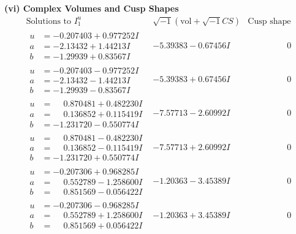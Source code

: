 \documentclass[1p]{elsarticle_modified}
\theoremstyle{definition}
\newcommand{\I}{\sqrt{-1}}
\begin{document}
\newpage\flushleft \textbf{(vi) Complex Volumes and Cusp Shapes}
$$\begin{array}{c|c|c}  
\text{Solutions to }I^u_{1}& \I (\text{vol} + \sqrt{-1}CS) & \text{Cusp shape}\\
 \hline 
\begin{aligned}
u &= -0.207403 + 0.977252 I \\
a &= -2.13432 + 1.44213 I \\
b &= -1.29939 + 0.83567 I\end{aligned}
 & -5.39383 - 0.67456 I & \phantom{-0.000000 } 0 \\ \hline\begin{aligned}
u &= -0.207403 - 0.977252 I \\
a &= -2.13432 - 1.44213 I \\
b &= -1.29939 - 0.83567 I\end{aligned}
 & -5.39383 + 0.67456 I & \phantom{-0.000000 } 0 \\ \hline\begin{aligned}
u &= \phantom{-}0.870481 + 0.482230 I \\
a &= \phantom{-}0.136852 + 0.115419 I \\
b &= -1.231720 - 0.550774 I\end{aligned}
 & -7.57713 - 2.60992 I & \phantom{-0.000000 } 0 \\ \hline\begin{aligned}
u &= \phantom{-}0.870481 - 0.482230 I \\
a &= \phantom{-}0.136852 - 0.115419 I \\
b &= -1.231720 + 0.550774 I\end{aligned}
 & -7.57713 + 2.60992 I & \phantom{-0.000000 } 0 \\ \hline\begin{aligned}
u &= -0.207306 + 0.968285 I \\
a &= \phantom{-}0.552789 - 1.258600 I \\
b &= \phantom{-}0.851569 - 0.056422 I\end{aligned}
 & -1.20363 - 3.45389 I & \phantom{-0.000000 } 0 \\ \hline\begin{aligned}
u &= -0.207306 - 0.968285 I \\
a &= \phantom{-}0.552789 + 1.258600 I \\
b &= \phantom{-}0.851569 + 0.056422 I\end{aligned}
 & -1.20363 + 3.45389 I & \phantom{-0.000000 } 0 \\ \hline\begin{aligned}

\end{aligned}
\end{array}$$
\end{document}
